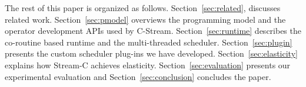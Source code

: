 The rest of this paper is organized as follows. Section~\ref{sec:related},
discusses related work. Section~\ref{sec:pmodel} overviews the programming
model and the operator development APIs used by C-Stream.
Section~\ref{sec:runtime} describes the co-routine based runtime and the
multi-threaded scheduler. Section~\ref{sec:plugin} presents the custom
scheduler plug-ins we have developed. Section~\ref{sec:elasticity} explains
how Stream-C achieves elasticity. Section~\ref{sec:evaluation} presents our
experimental evaluation and Section~\ref{sec:conclusion} concludes the paper.


